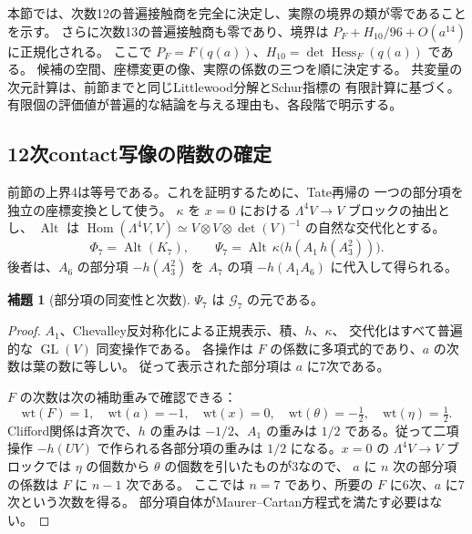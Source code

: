 \documentclass[a4paper,11pt]{ltjsarticle}
\theoremstyle{definition}
\newtheorem{lemma}[theorem]{補題}
\begin{document}
本節では、次数12の普遍接触商を完全に決定し、実際の境界の類が零であることを示す。
さらに次数13の普遍接触商も零であり、境界は
$P_F+H_{10}/96+O(a^{14})$ に正規化される。
ここで $P_F=F(q(a))$、$H_{10}=\det\operatorname{Hess}_F(q(a))$ である。
候補の空間、座標変更の像、実際の係数の三つを順に決定する。
共変量の次元計算は、前節までと同じLittlewood分解とSchur指標の
有限計算\cite{BeteaWheeler,DeBoeckPagetWildon}に基づく。
有限個の評価値が普遍的な結論を与える理由も、各段階で明示する。

\subsection{12次contact写像の階数の確定}
\label{subsec:v10-contact-exact-rank}

前節の上界4は等号である。これを証明するために、Tate再帰の
一つの部分項を独立の座標変換として使う。
$\kappa$ を $x=0$ における $\Lambda^4V\to V$ ブロックの抽出とし、
$\operatorname{Alt}$ は
$\operatorname{Hom}(\Lambda^4V,V)\simeq
V\otimes V\otimes\det(V)^{-1}$ の自然な交代化とする。
\[
 \Phi_7=\operatorname{Alt}(K_7),\qquad
 \Psi_7=\operatorname{Alt}\,\kappa
       \bigl(h(A_1\,h(A_3^2))\bigr).
\]
後者は、$A_6$ の部分項 $-h(A_3^2)$ を
$A_7$ の項 $-h(A_1A_6)$ に代入して得られる。

\begin{lemma}[部分項の同変性と次数]
$\Psi_7$ は $\mathcal G_7$ の元である。
\end{lemma}
\begin{proof}
$A_1$、Chevalley反対称化による正規表示、積、$h$、$\kappa$、
交代化はすべて普遍的な $\operatorname{GL}(V)$ 同変操作である。
各操作は $F$ の係数に多項式的であり、$a$ の次数は葉の数に等しい。
従って表示された部分項は $a$ に7次である。

$F$ の次数は次の補助重みで確認できる：
\[
 \mathrm{wt}(F)=1,\quad\mathrm{wt}(a)=-1,\quad
 \mathrm{wt}(x)=0,\quad
 \mathrm{wt}(\theta)=-\tfrac12,\quad
 \mathrm{wt}(\eta)=\tfrac12.
\]
Clifford関係は斉次で、$h$ の重みは $-1/2$、$A_1$ の重みは
$1/2$ である。従って二項操作 $-h(UV)$ で作られる各部分項の重みは
$1/2$ になる。$x=0$ の $\Lambda^4V\to V$ ブロックでは
$\eta$ の個数から $\theta$ の個数を引いたものが3なので、
$a$ に $n$ 次の部分項の係数は $F$ に $n-1$ 次である。
ここでは $n=7$ であり、所要の $F$ に6次、$a$ に7次という次数を得る。
部分項自体がMaurer--Cartan方程式を満たす必要はない。
\end{proof}
\end{document}
